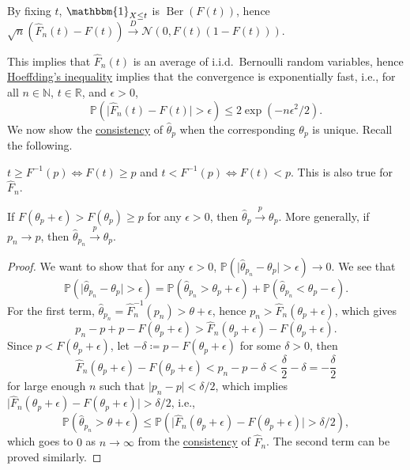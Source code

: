\begin{note}
	By fixing \(t\), \(\mathbbm{1}_{X \leq t} \) is \(\operatorname{Ber}(F(t)) \), hence \(\sqrt{n} (\hat{F} _n(t) - F(t)) \overset{D}{\to} \mathcal{N} (0, F(t) (1 - F(t)))\).
\end{note}

This implies that \(\hat{F} _n(t)\) is an average of i.i.d.\ Bernoulli random variables, hence \href{https://en.wikipedia.org/wiki/Hoeffding's_inequality}{Hoeffding's inequality} implies that the convergence is exponentially fast, i.e., for all \(n \in \mathbb{N} \), \(t\in \mathbb{R} \), and \(\epsilon > 0\),
\[
	\mathbb{P} (\vert \hat{F} _n(t) - F(t) \vert > \epsilon )
	\leq 2 \exp (- n \epsilon ^2 / 2).
\]
We now show the \hyperref[def:consistent]{consistency} of \(\hat{\theta} _p\) when the corresponding \(\theta _p\) is unique. Recall the following.

\begin{prev}
	\(t \geq F^{-1} (p) \iff F(t) \geq p\) and \(t < F^{-1} (p) \iff F(t) < p\). This is also true for \(\hat{F} _n\).
\end{prev}

\begin{theorem}\label{thm:sample-quantile-consistency}
	If \(F(\theta _p + \epsilon ) > F(\theta _p) \geq p\) for any \(\epsilon > 0\), then \(\hat{\theta} _p \overset{p}{\to} \theta _p\). More generally, if \(p_n \to p\), then \(\hat{\theta} _{p_n} \overset{p}{\to} \theta _p\).
\end{theorem}
\begin{proof}
	We want to show that for any \(\epsilon > 0\), \(\mathbb{P} (\vert \hat{\theta} _{p_n} - \theta _p \vert > \epsilon ) \to 0\). We see that
	\[
		\mathbb{P} (\vert \hat{\theta} _{p_n} - \theta _p \vert > \epsilon )
		= \mathbb{P} (\hat{\theta} _{p_n} > \theta _p + \epsilon ) + \mathbb{P} (\hat{\theta} _{p_n} < \theta _p - \epsilon ).
	\]
	For the first term, \(\hat{\theta} _{p_n} = \hat{F} _n^{-1} (p_n) > \theta + \epsilon \), hence \(p_n > \hat{F} _n(\theta _p + \epsilon )\), which gives
	\[
		p_n - p + p  - F(\theta _p + \epsilon )
		> \hat{F} _n(\theta _p + \epsilon ) - F(\theta _p + \epsilon ).
	\]
	Since \(p < F(\theta _p + \epsilon )\), let \(- \delta \coloneqq p - F(\theta _p + \epsilon )\) for some \(\delta > 0\), then
	\[
		\hat{F} _n(\theta _p + \epsilon ) - F(\theta _p + \epsilon )
		< p_n - p - \delta
		< \frac{\delta}{2} - \delta
		= -\frac{\delta}{2}
	\]
	for large enough \(n\) such that \(\vert p_n - p \vert < \delta / 2\), which implies \(\vert \hat{F} _n(\theta _p + \epsilon ) - F(\theta _p + \epsilon ) \vert > \delta / 2\), i.e.,
	\[
		\mathbb{P} (\hat{\theta} _{p_n} > \theta + \epsilon )
		\leq \mathbb{P} (\vert \hat{F} _n(\theta _p + \epsilon ) - F(\theta _p + \epsilon ) \vert > \delta / 2),
	\]
	which goes to \(0\) as \(n \to \infty \) from the \hyperref[def:consistent]{consistency} of \(\hat{F} _n\). The second term can be proved similarly.
\end{proof}

